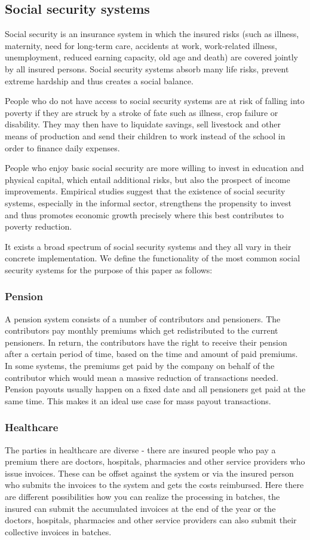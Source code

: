 \subsection{Social security systems}
Social security is an insurance system in which the insured risks (such as illness, maternity, need for long-term care, accidents at work, work-related illness, unemployment, reduced earning capacity, old age and death) are covered jointly by all insured persons. Social security systems absorb many life risks, prevent extreme hardship and thus creates a social balance. 

People who do not have access to social security systems are at risk of falling into poverty if they are struck by a stroke of fate such as illness, crop failure or disability. They may then have to liquidate savings, sell livestock and other means of production and send their children to work instead of the school in order to finance daily expenses. \cite{erd}

People who enjoy basic social security are more willing to invest in education and physical capital, which entail additional risks, but also the prospect of income improvements. Empirical studies suggest that the existence of social security systems, especially in the informal sector, strengthens the propensity to invest and thus promotes economic growth precisely where this best contributes to poverty reduction. \cite{hcms}

It exists a broad spectrum of social security systems and they all vary in their concrete implementation. We define the functionality of the most common social security systems for the purpose of this paper as follows:

\subsubsection*{Pension}
A pension system consists of a number of contributors and pensioners. The contributors pay monthly premiums which get redistributed to the current pensioners. In return, the contributors have the right to receive their pension after a certain period of time, based on the time and amount of paid premiums. In some systems, the premiums get paid by the company on behalf of the contributor which would mean a massive reduction of transactions needed.
Pension payouts usually happen on a fixed date and all pensioners get paid at the same time. This makes it an ideal use case for mass payout transactions.

\subsubsection*{Healthcare}
The parties in healthcare are diverse - there are insured people who pay a premium there are doctors, hospitals, pharmacies and other service providers who issue invoices. These can be offset against the system or via the insured person who submits the invoices to the system and gets the costs reimbursed. Here there are different possibilities how you can realize the processing in batches, the insured can submit the accumulated invoices at the end of the year or the doctors, hospitals, pharmacies and other service providers can also submit their collective invoices in batches.

